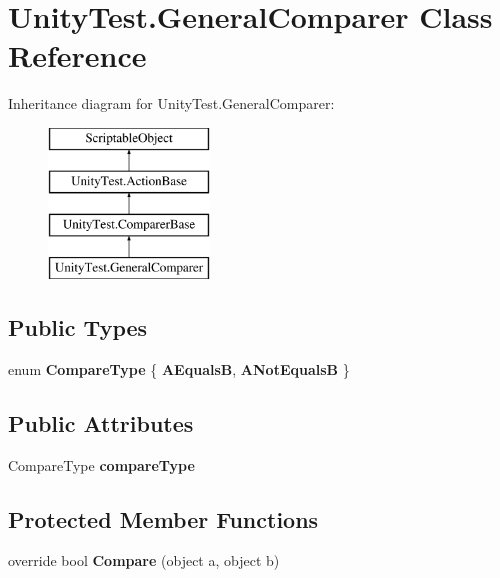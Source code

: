 \hypertarget{class_unity_test_1_1_general_comparer}{}\section{Unity\+Test.\+General\+Comparer Class Reference}
\label{class_unity_test_1_1_general_comparer}
Inheritance diagram for Unity\+Test.\+General\+Comparer\+:\begin{figure}[H]
\begin{center}
\leavevmode
\includegraphics[height=4.000000cm]{class_unity_test_1_1_general_comparer}
\end{center}
\end{figure}
\subsection*{Public Types}
\begin{DoxyCompactItemize}
\item 
\mbox{\label{class_unity_test_1_1_general_comparer_ac4539042c2b37bbfffd39d676397b411}} 
enum {\bfseries Compare\+Type} \{ {\bfseries A\+EqualsB}, 
{\bfseries A\+Not\+EqualsB}
 \}
\end{DoxyCompactItemize}
\subsection*{Public Attributes}
\begin{DoxyCompactItemize}
\item 
\mbox{\label{class_unity_test_1_1_general_comparer_a5dfa662fdb6d95d6f8994c7ae99cbf39}} 
Compare\+Type {\bfseries compare\+Type}
\end{DoxyCompactItemize}
\subsection*{Protected Member Functions}
\begin{DoxyCompactItemize}
\item 
\mbox{\label{class_unity_test_1_1_general_comparer_ad8af2ea03c2866b1772c5a17bb8b8709}} 
override bool {\bfseries Compare} (object a, object b)
\end{DoxyCompactItemize}
